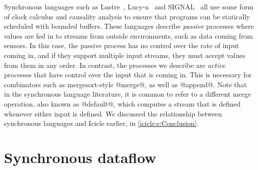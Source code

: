 Synchronous languages such as {\sc Lustre}~\cite{halbwachs1991synchronous}, Lucy-n~\cite{mandel2010lucy} and SIGNAL~\cite{le2003polychrony} all use some form of clock calculus and causality analysis to ensure that programs can be statically scheduled with bounded buffers.
These languages describe \emph{passive} processes where values are fed in to streams from outside environments, such as data coming from sensors.
In this case, the passive process has no control over the rate of input coming in, and if they support multiple input streams, they must accept values from them in any order.
In contrast, the processes we describe are \emph{active} processes that have control over the input that is coming in.
This is necessary for combinators such as mergesort-style @merge@, as well as @append@.
Note that in the synchronous language literature, it is common to refer to a different merge operation, also known as @default@, which computes a stream that is defined whenever either input is defined.
We discussed the relationship between synchronous languages and Icicle earlier, in \cref{icicle:s:Conclusion}.

\section{Synchronous dataflow}
\label{related/synchronous-dataflow}

